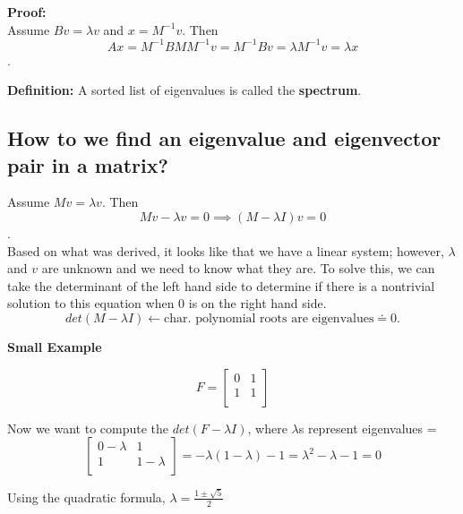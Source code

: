 \documentclass{article}
\begin{document}
    \textbf{Proof:} 
    \\ Assume $Bv = \lambda v$ and $x = M^{-1}v$. Then $$Ax = M^{-1}BMM^{-1}v = M^{-1}Bv = \lambda M^{-1}v = \lambda x$$.
    
\textbf{Definition:} A sorted list of eigenvalues is called the \textbf{spectrum}.    

\subsection{How to we find an eigenvalue and eigenvector pair in a matrix?}

 Assume $Mv = \lambda v$. Then $$Mv - \lambda v = 0 \implies (M - \lambda I)v = 0$$. \\ Based on what was derived, it looks like that we have a linear system; however, $\lambda$ and $v$ are unknown and we need to know what they are. To solve this, we can take the determinant of the left hand side to determine if there is a nontrivial solution to this equation when 0 is on the right hand side.
 $$det(M - \lambda I) \leftarrow \text{char. polynomial roots are eigenvalues} \doteq 0.$$
 
\textbf{Small Example}  

 \[
   F=
  \left[ {\begin{array}{cccc}
   0 & 1 \\
   1 & 1 \\

  \end{array} } \right]
\]

Now we want to compute the $det(F - \lambda I)$, where $\lambda$s represent eigenvalues =  \[
  \left[ {\begin{array}{cccc}
   0-\lambda & 1 \\
   1 & 1-\lambda \\

  \end{array} } \right]
  = - \lambda (1-\lambda) -1 = \lambda^2 - \lambda -1 = 0
\]

Using the quadratic formula, $\lambda = \frac{1 \pm \sqrt{5}}{2}$
\end{document}
